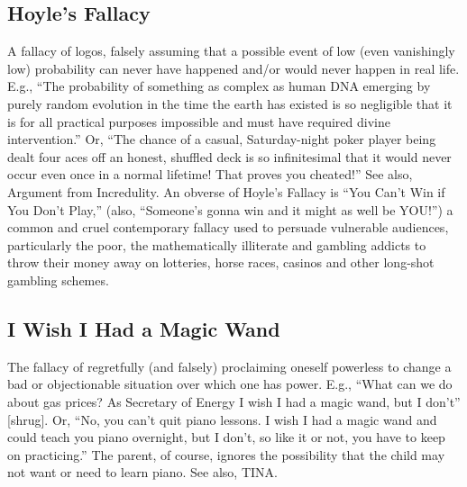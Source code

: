 \documentclass[10pt,a4paper,british]{article}
\begin{document}
\begin{multicols}{2}
    \subsection{Hoyle's Fallacy} A fallacy of logos, falsely assuming that a possible event of low (even vanishingly low) probability can never have happened and/or would never happen in real life. E.g., ``The probability of something as complex as human DNA emerging by purely random evolution in the time the earth has existed is so negligible that it is for all practical purposes impossible and must have required divine intervention.'' Or, ``The chance of a casual, Saturday{-}night poker player being dealt four aces off an honest, shuffled deck is so infinitesimal that it would never occur even once in a normal lifetime!  That proves you cheated!'' See also, Argument from Incredulity. An obverse of Hoyle's Fallacy is ``You Can't Win if You Don't Play,'' (also, ``Someone's gonna win and it might as well be YOU!'') a common and cruel contemporary fallacy used to persuade vulnerable audiences, particularly the poor, the mathematically illiterate and gambling addicts to throw their money away on lotteries, horse races, casinos and other long{-}shot gambling schemes.  

    \subsection{I Wish I Had a Magic Wand} The fallacy of regretfully (and falsely) proclaiming oneself powerless to change a bad or objectionable situation over which one has power. E.g., ``What can we do about gas prices? As Secretary of Energy I wish I had a magic wand, but I don't'' [shrug]. Or, ``No, you can't quit piano lessons. I wish I had a magic wand and could teach you piano overnight, but I don't, so like it or not, you have to keep on practicing.'' The parent, of course, ignores the possibility that the child may not want or need to learn piano. See also, TINA.  


\end{multicols}
\end{document}
